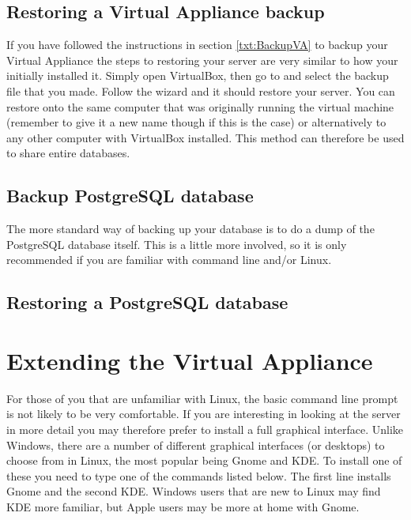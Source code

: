 \subsection{Restoring a Virtual Appliance backup}
If you have followed the instructions in section \ref{txt:BackupVA} to backup your Virtual Appliance the steps to restoring your server are very similar to how your initially installed it.  Simply open VirtualBox, then go to  and select the backup file that you made.  Follow the wizard and it should restore your server.  You can restore onto the same computer that was originally running the virtual machine (remember to give it a new name though if this is the case) or alternatively to any other computer with VirtualBox installed.  This method can therefore be used to share entire databases.


\subsection{Backup PostgreSQL database}
The more standard way of backing up your database is to do a dump of the PostgreSQL database itself.  This is a little more involved, so it is only recommended if you are familiar with command line and/or Linux.

\subsection{Restoring a PostgreSQL database}

\section{Extending the Virtual Appliance}
For those of you that are unfamiliar with Linux, the basic command line prompt is not likely to be very comfortable.  If you are interesting in looking at the server in more detail you may therefore prefer to install a full graphical interface.  Unlike Windows, there are a number of different graphical interfaces (or desktops) to choose from in Linux, the most popular being Gnome and KDE.  To install one of these you need to type one of the commands listed below.  The first line installs Gnome and the second KDE. Windows users that are new to Linux may find KDE more familiar, but Apple users may be more at home with Gnome.


